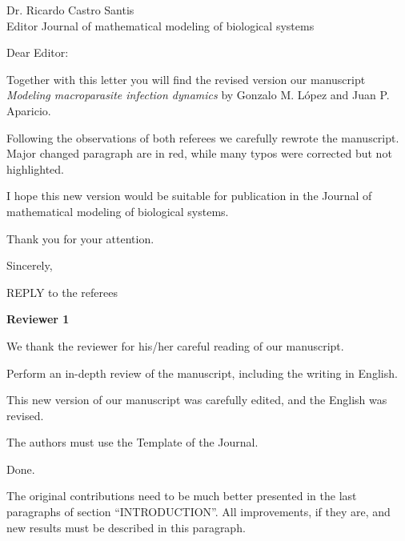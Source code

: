 \documentclass [12pt]{letter}
\begin{document}
\signature{Gonzalo Maximiliano López}
\address{Dr. Gonzalo Maximiliano López\\
 INENCO\\ Universidad Nacional de Salta\\
 4400 Salta, Argentina}


\begin{letter}{Dr. Ricardo Castro Santis\\ Editor Journal of mathematical modeling of biological systems}



\opening{Dear Editor: }

Together with this letter you will find the revised version our manuscript {\it
Modeling macroparasite infection dynamics} by Gonzalo M. López and Juan P. Aparicio.

Following the observations of both referees we carefully rewrote the manuscript. Major changed paragraph are in red, while many typos were corrected but not highlighted.

I hope this new version would be suitable for publication in the Journal of mathematical modeling of biological systems.

Thank you for your attention.

\closing{Sincerely,}
\thispagestyle{empty}

\newpage
REPLY to the referees





\textbf{Reviewer 1}

We thank the reviewer for his/her careful reading of our manuscript.
	
\begin{enumerate}
		\item Perform an in-depth review of the manuscript, including the writing
		in English.
		
		This new version of our manuscript was carefully edited, and the
		English was revised.
		
		\item The authors must use the Template of the Journal.
		
		Done.
		
		{\color{red}
		\item The original contributions need to be much better presented in the
		last paragraphs of section ``INTRODUCTION”. All improvements, if they are, and new results must
		be described in this paragraph.
		
}
\end{enumerate}
\end{letter}
\end{document}
